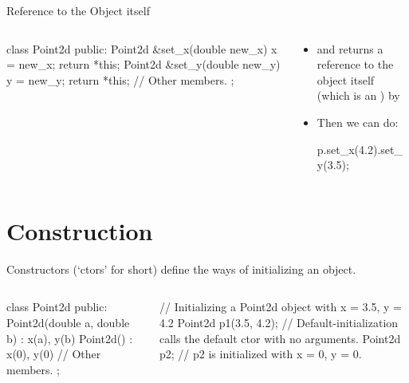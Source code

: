 \documentclass{beamer}
\begin{document}
\begin{frame}[fragile]{Reference to the Object itself}
    \begin{columns}
        \begin{column}{0.5\linewidth}
            \begin{cpp}
class Point2d {
 public:
  Point2d &set_x(double new_x) {
    x = new_x;
    return *this;
  }
  Point2d &set_y(double new_y) {
    y = new_y;
    return *this;
  }
  // Other members.
};
            \end{cpp}        
        \end{column}
        \begin{column}{0.5\linewidth}
            \begin{itemize}
                \item {} and  returns a reference to the object itself (which is an ) by 
                \item Then we can do:
                \begin{cpp}
p.set_x(4.2).set_y(3.5);
                \end{cpp}
            \end{itemize}
        \end{column}
    \end{columns}
\end{frame}

\section{Construction}

\begin{frame}[fragile]{Constructors}
     (`ctors' for short) define the ways of initializing an object.
    \begin{columns}
        \begin{column}{0.5\linewidth}
            \begin{cpp}
class Point2d {
 public:
  Point2d(double a, double b)
    : x(a), y(b) {}
  Point2d() : x(0), y(0) {}
  // Other members.
};
            \end{cpp}
        \end{column}
        \begin{column}{0.5\linewidth}
            \begin{cpp}
// Initializing a Point2d object with x = 3.5, y = 4.2
Point2d p1(3.5, 4.2);
// Default-initialization calls the default ctor with no arguments.
Point2d p2;
// p2 is initialized with x = 0, y = 0.
            \end{cpp}
        \end{column}
    \end{columns}
\end{frame}
\end{document}
